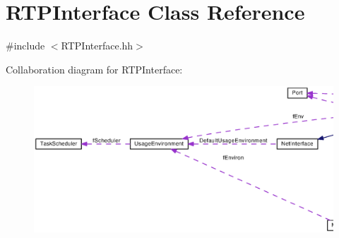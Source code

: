 \section{R\+T\+P\+Interface Class Reference}
\label{classRTPInterface}


{\ttfamily \#include $<$R\+T\+P\+Interface.\+hh$>$}



Collaboration diagram for R\+T\+P\+Interface\+:
\nopagebreak
\begin{figure}[H]
\begin{center}
\leavevmode
\includegraphics[width=350pt]{classRTPInterface__coll__graph}
\end{center}
\end{figure}
